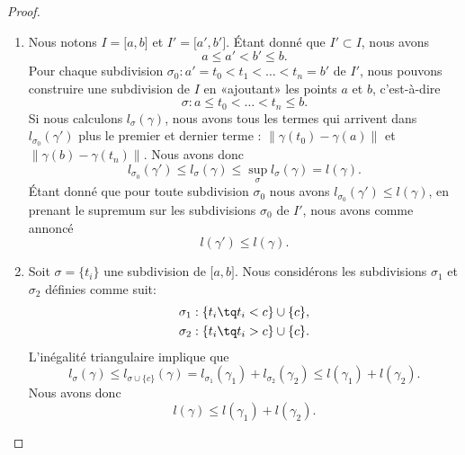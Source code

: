 \begin{proof}
    \begin{enumerate}
        \item
            Nous notons $I=\mathopen[ a , b \mathclose]$ et $I'=\mathopen[ a' , b' \mathclose]$. Étant donné que $I'\subset I$, nous avons
            \begin{equation}
                a\leq a'<b'\leq b.
            \end{equation}
            Pour chaque subdivision $\sigma_0:a'=t_0<t_1<\ldots<t_n=b'$ de $I'$, nous pouvons construire une subdivision de $I$ en «ajoutant» les points $a$ et $b$, c'est-à-dire
            \begin{equation}
                \sigma:a\leq t_0<\ldots<t_n\leq b.
            \end{equation}
            Si nous calculons $l_{\sigma}(\gamma)$, nous avons tous les termes qui arrivent dans $l_{\sigma_0}(\gamma')$ plus le premier et dernier terme : $\| \gamma(t_0)-\gamma(a) \|$ et $\| \gamma(b)-\gamma(t_n)\|$. Nous avons donc
            \begin{equation}
                l_{\sigma_0}(\gamma')\leq l_{\sigma}(\gamma)\leq\sup_{\sigma}l_{\sigma}(\gamma)=l(\gamma).
            \end{equation}
            Étant donné que pour toute subdivision $\sigma_0$ nous avons $l_{\sigma_0}(\gamma')\leq l(\gamma)$, en prenant le supremum sur les subdivisions $\sigma_0$ de $I'$, nous avons comme annoncé
            \begin{equation}
                l(\gamma')\leq l(\gamma).
            \end{equation}
        \item
            Soit $\sigma=\{ t_i \}$ une subdivision de $\mathopen[ a , b \mathclose]$. Nous considérons les subdivisions $\sigma_1$ et $\sigma_2$ définies comme suit:
            \begin{equation}
                \begin{aligned}[]
                    \sigma_1&:\{ t_i\tq t_i< c \}\cup\{ c \},\\
                    \sigma_2&:\{ t_i\tq t_i> c \}\cup\{ c \}.
                \end{aligned}
            \end{equation}
            L'inégalité triangulaire implique que
            \begin{equation}
                l_{\sigma}(\gamma)\leq l_{\sigma\cup\{ c \}}(\gamma)=l_{\sigma_1}(\gamma_1)+l_{\sigma_2}(\gamma_2)\leq l(\gamma_1)+l(\gamma_2).
            \end{equation}
            Nous avons donc
            \begin{equation}    \label{EqIneglglglgud}
                l(\gamma)\leq l(\gamma_1)+l(\gamma_2).
            \end{equation}


\end{enumerate}
\end{proof}
